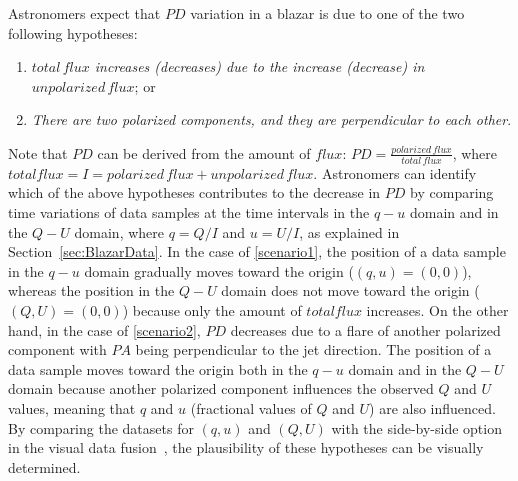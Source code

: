Astronomers expect that $PD$ variation in a blazar is due to one of the two following hypotheses:
\begin{enumerate}[nosep, label=\textsl{Hypothesis \arabic*}:, ref=\textsl{Hypothesis \arabic*}, align=parleft, leftmargin=*]
    \item \textsl{$total\,flux$ increases (decreases) due to the increase (decrease) in $unpolarized\,flux$}; or  \label{scenario1}
    \item \textsl{There are two polarized components, and they are perpendicular to each other}. \label{scenario2}
\end{enumerate}
Note that $PD$ can be derived from the amount of $flux$: $PD = \frac{polarized\,flux}{total\,flux}$,
where $total flux = I = polarized\,flux + unpolarized\,flux$.
Astronomers can identify which of the above hypotheses contributes to the decrease in $PD$
by comparing time variations of data samples at the time intervals in the $q - u$ domain and in the $Q-U$ domain,
where $q = Q / I$ and $u = U / I$, as explained in Section~\ref{sec:BlazarData}.
In the case of \ref{scenario1}, the position of a data sample in the $q - u$ domain gradually moves toward the origin ($(q, u) = (0, 0)$),
whereas the position in the $Q-U$ domain does not move toward the origin ($(Q, U) = (0, 0)$)
because only the amount of $total flux$ increases.
On the other hand, in the case of \ref{scenario2}, 
$PD$ decreases due to a flare of another polarized component with $PA$ being perpendicular to the jet direction.
The position of a data sample moves toward the origin both in the $q - u$ domain and in the $Q - U$ domain 
because another polarized component influences the observed $Q$ and $U$ values, 
meaning that $q$ and $u$ (fractional values of $Q$ and $U$) are also influenced.
By comparing the datasets for $(q, u)$ and $(Q, U)$ with the side-by-side option in the visual data fusion~\cite{Fujishiro2018},
the plausibility of these hypotheses can be visually determined.

